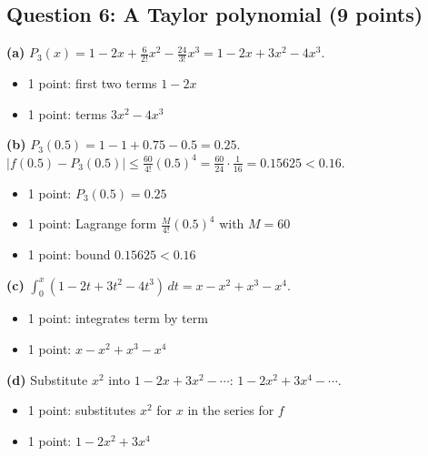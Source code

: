\documentclass{apcalc}
\begin{document}
\subsection*{Question 6: A Taylor polynomial (9 points)}
\textbf{(a)} $P_3(x)=1-2x+\frac{6}{2!}x^2-\frac{24}{3!}x^3=1-2x+3x^2-4x^3$.
\begin{itemize}[leftmargin=1.6em,itemsep=0pt]
\item 1 point: first two terms $1-2x$
\item 1 point: terms $3x^2-4x^3$
\end{itemize}
\textbf{(b)} $P_3(0.5)=1-1+0.75-0.5=0.25$. $|f(0.5)-P_3(0.5)|\le\frac{60}{4!}(0.5)^4=\frac{60}{24}\cdot\frac{1}{16}=0.15625<0.16$.
\begin{itemize}[leftmargin=1.6em,itemsep=0pt]
\item 1 point: $P_3(0.5)=0.25$
\item 1 point: Lagrange form $\frac{M}{4!}(0.5)^4$ with $M=60$
\item 1 point: bound $0.15625<0.16$
\end{itemize}
\textbf{(c)} $\int_0^x(1-2t+3t^2-4t^3)\,dt=x-x^2+x^3-x^4$.
\begin{itemize}[leftmargin=1.6em,itemsep=0pt]
\item 1 point: integrates term by term
\item 1 point: $x-x^2+x^3-x^4$
\end{itemize}
\textbf{(d)} Substitute $x^2$ into $1-2x+3x^2-\cdots$: $1-2x^2+3x^4-\cdots$.
\begin{itemize}[leftmargin=1.6em,itemsep=0pt]
\item 1 point: substitutes $x^2$ for $x$ in the series for $f$
\item 1 point: $1-2x^2+3x^4$
\end{itemize}
\end{document}
